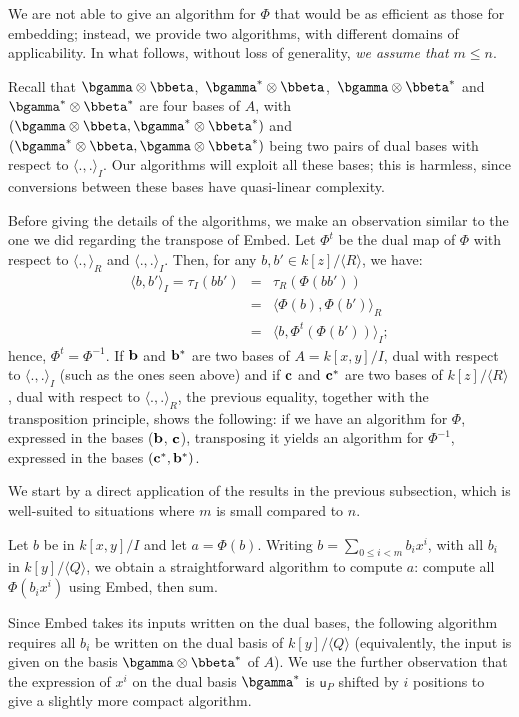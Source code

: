\documentclass{sig-alternate}
\def\vu {\ensuremath{\mathsf{u}}}
\newcounter{algo}
\newcommand{\ang}[1]{\langle#1\rangle}
\begin{document}
We are not able to give an algorithm for $\Phi$ that would be as
efficient as those for embedding; instead, we provide two algorithms,
with different domains of applicability. In what follows, without
loss of generality, {\em we assume that $m\le n$}.

Recall that $\bgamma \otimes \bbeta$,\ $\bgamma^\ast \otimes
\bbeta$,\ $\bgamma \otimes \bbeta^\ast$ and $\bgamma^\ast \otimes
\bbeta^\ast$ are four bases of $A$, with $(\bgamma \otimes \bbeta,
\bgamma^\ast \otimes \bbeta^\ast)$ and $(\bgamma^\ast \otimes \bbeta,
\bgamma \otimes \bbeta^\ast)$ being two pairs of dual bases with
respect to $\ang{.,.}_I$. Our algorithms will exploit all these bases;
this is harmless, since conversions between these bases have
quasi-linear complexity.

Before giving the details of the algorithms, we make an observation
similar to the one we did regarding the transpose of Embed. Let
$\Phi^t$ be the dual map of $\Phi$ with respect to $\ang{.,}_R$ and
$\ang{.,.}_I$. Then, for any $b,b' \in k[z]/\ang{R}$, we have:
\begin{eqnarray*}
\ang{b,b'}_I=\tau_I(b b') &=&  \tau_R(\Phi(b b'))\\
&=& \ang{\Phi(b), \Phi(b')}_R \\
&=& \ang{b, \Phi^t(\Phi(b'))}_I;
\end{eqnarray*}
hence, $\Phi^t = \Phi^{-1}$. If ${\bf b}$ and ${\bf b}^\ast$ are two
bases of $A=k[x,y]/I$, dual with respect to $\ang{.,.}_I$ (such as the
ones seen above) and if ${\bf c}$ and ${\bf c}^\ast$ are two bases of
$k[z]/\ang{R}$, dual with respect to $\ang{.,.}_R$, the previous
equality, together with the transposition principle, shows the
following: if we have an algorithm for $\Phi$, expressed in the bases
(${\bf b}$, ${\bf c}$), transposing it yields an algorithm for
$\Phi^{-1}$, expressed in the bases $({\bf c}^\ast,{\bf b}^\ast)$.

\smallskip{}
We start by a direct application of the results in the previous
subsection, which is well-suited to situations where $m$ is small
compared to $n$.

Let $b$ be in $k[x,y]/I$ and let $a=\Phi(b)$. Writing $b=\sum_{0 \le i
  < m} b_i x^i$, with all $b_i$ in $k[y]/\ang{Q}$, we obtain a
straightforward algorithm to compute $a$: compute all $\Phi(b_i x^i)$
using {\sf Embed}, then sum.

Since {\sf Embed} takes its inputs written on the dual
bases, the following algorithm requires all $b_i$ be written on the
dual basis of $k[y]/\ang{Q}$ (equivalently, the input is given on the
basis $\bgamma \otimes \bbeta^\ast$ of $A$). We use the further
observation that the expression of $x^i$ on the dual basis
$\bgamma^\ast$ is $\vu_P$ shifted by $i$ positions to give a slightly
more compact algorithm.
\end{document}
